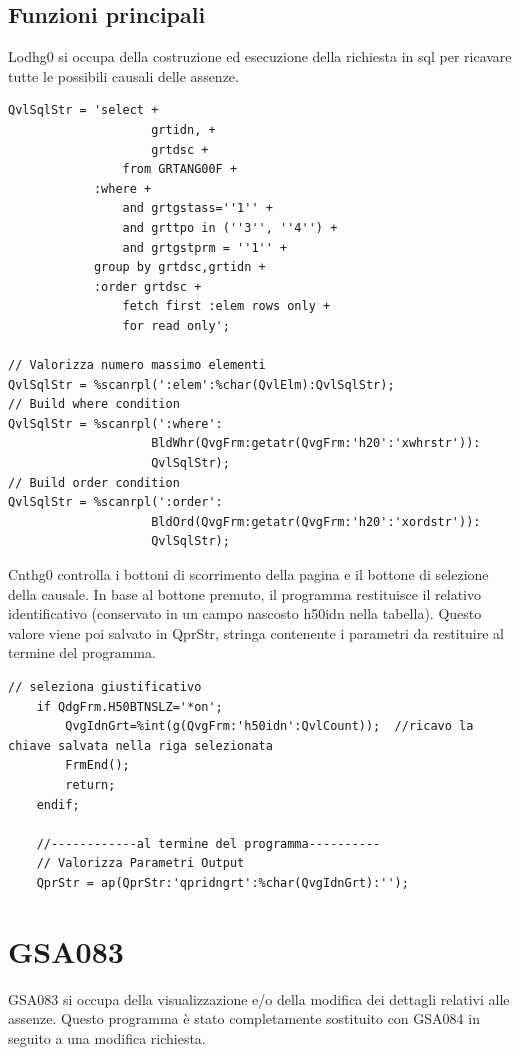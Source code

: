 \documentclass[target=bach,aauheader=,style=]{thud}
\begin{document}
\subsection{Funzioni principali}
Lodhg0 si occupa della costruzione ed esecuzione della richiesta in sql per ricavare tutte le possibili causali delle assenze.
\begin{lstlisting}[language=RPG, caption=Codice RPG di controllo dei pulsanti]
 QvlSqlStr = 'select +
                    grtidn, +
                    grtdsc +
                from GRTANG00F +
            :where +
                and grtgstass=''1'' +
                and grttpo in (''3'', ''4'') +
                and grtgstprm = ''1'' +
            group by grtdsc,grtidn +
            :order grtdsc +
                fetch first :elem rows only +
                for read only';

// Valorizza numero massimo elementi
QvlSqlStr = %scanrpl(':elem':%char(QvlElm):QvlSqlStr);
// Build where condition
QvlSqlStr = %scanrpl(':where':
                    BldWhr(QvgFrm:getatr(QvgFrm:'h20':'xwhrstr')):
                    QvlSqlStr);
// Build order condition
QvlSqlStr = %scanrpl(':order':
                    BldOrd(QvgFrm:getatr(QvgFrm:'h20':'xordstr')):
                    QvlSqlStr);
\end{lstlisting}

Cnthg0 controlla i bottoni di scorrimento della pagina e il bottone di selezione della causale.
In base al bottone premuto, il programma restituisce il relativo identificativo (conservato in un campo nascosto h50idn nella tabella).
Questo valore viene poi salvato in QprStr, stringa contenente i parametri da restituire al termine del programma.
\begin{lstlisting}[language=RPG, caption=Codice RPG di controllo dei pulsanti]
// seleziona giustificativo
    if QdgFrm.H50BTNSLZ='*on';
        QvgIdnGrt=%int(g(QvgFrm:'h50idn':QvlCount));  //ricavo la chiave salvata nella riga selezionata
        FrmEnd();
        return;
    endif;

    //------------al termine del programma----------
    // Valorizza Parametri Output
    QprStr = ap(QprStr:'qpridngrt':%char(QvgIdnGrt):'');
\end{lstlisting}
\break

\section{GSA083}
GSA083 si occupa della visualizzazione e/o della modifica dei dettagli relativi alle assenze.
Questo programma è stato completamente sostituito con GSA084 in seguito a una modifica richiesta.
\end{document}
